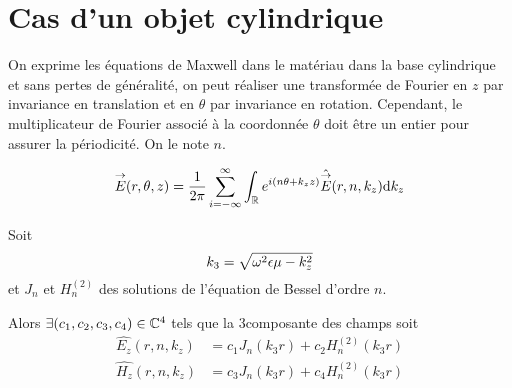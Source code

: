 \section{Cas d'un objet cylindrique}


    \begin{figure}[!hbt]
        \centering
        \begin{tikzpicture}
            
        \end{tikzpicture}
    \end{figure}

    On exprime les équations de Maxwell dans le matériau dans la base cylindrique et sans pertes de généralité, on peut réaliser une transformée de Fourier en \(z\) par invariance en translation et en \(\theta\) par invariance en rotation.
    Cependant, le multiplicateur de Fourier associé à la coordonnée \(\theta\) doit être un entier pour assurer la périodicité. On le note \(n\).

    \begin{equation}
        \vE(r,\theta,z) = \frac{1}{2\pi}\sum_{i=-\infty}^{\infty}\int_{\RR} e^{i(n \theta + k_z z )}\hat{\vE} (r,n,k_z) \dd{k_z}
    \end{equation}

    \begin{prop}
        Soit
        \begin{equation}
            k_3 = \sqrt{\w^2\eps\mu - k_z^2}
        \end{equation}
        et \(J_n\) et \(H_n^{(2)}\) des solutions de l'équation de Bessel d'ordre \(n\).
        
        Alors \(\exists (c_1,c_2,c_3,c_4) \in \CC^4\) tels que la 3\ieme composante des champs soit
        \begin{subequations}
            \begin{align}
                \hat{E_z}(r,n,k_z) &= c_1 J_n\left(k_3r\right) + c_2 H_n^{(2)}\left(k_3r\right)
                \\
                \hat{H_z}(r,n,k_z) &= c_3 J_n\left(k_3r\right) + c_4 H_n^{(2)}\left(k_3r\right)
            \end{align}
        \end{subequations}
    \end{prop}

